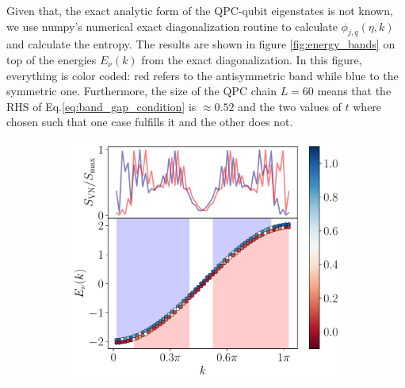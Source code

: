 \documentclass{article}
\begin{document}
Given that, the exact analytic form of the QPC-qubit eigenstates is not known, we use numpy's numerical exact diagonalization routine to calculate $\phi_{j,q}(\eta,k)$ and calculate the entropy. The results are shown in figure \ref{fig:energy_bands} on top of the energies $E_\nu(k)$ from the exact diagonalization. In this figure, everything is color coded: red refers to the antisymmetric band while blue to the symmetric one. Furthermore, the size of the QPC chain $L=60$ means that the RHS of Eq.\eqref{eq:band_gap_condition} is $\approx 0.52$ and the two values of $t$ where chosen such that one case fulfills it and the other does not. 

\begin{figure}[h]
    \centering
    \begin{subfigure}[b]{0.43\textwidth}
        \includegraphics[width=\textwidth]{figures/report_08_2025/exact_energies_Lqpc=60_Omega=0.4_t=0.05.pdf}
        \caption{}
    \end{subfigure}
    \hspace{0.001\textwidth}
    \begin{subfigure}[b]{0.43\textwidth}

\end{subfigure}
\end{figure}
\end{document}
